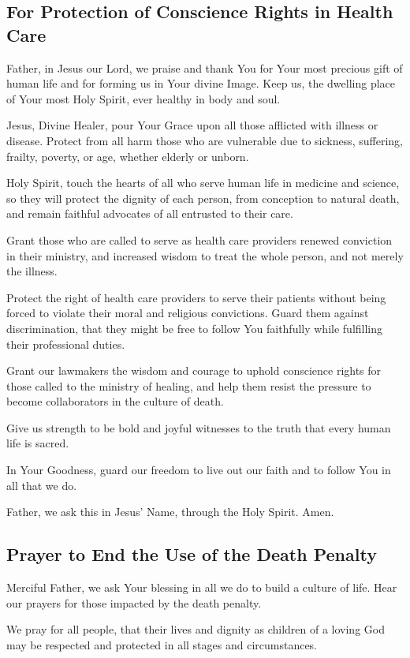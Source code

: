 \documentclass[12pt]{article}
\newcommand{\prayertitle}[1]{\subsection{#1}}
\begin{document}
\prayertitle{For Protection of Conscience Rights in Health Care}
Father, in Jesus our Lord, we praise and thank You for Your most precious gift of human life and for forming us in Your divine Image.
Keep us, the dwelling place of Your most Holy Spirit, ever healthy in body and soul.

Jesus, Divine Healer, pour Your Grace upon all those afflicted with illness or disease.
Protect from all harm those who are vulnerable due to sickness, suffering, frailty, poverty, or age, whether elderly or unborn.

Holy Spirit, touch the hearts of all who serve human life in medicine and science, so they will protect the dignity of each person, from conception to natural death, and remain faithful advocates of all entrusted to their care.  

Grant those who are called to serve as health care providers renewed conviction in their ministry, and increased wisdom to treat the whole person, and not merely the illness.

Protect the right of health care providers to serve their patients without being forced to violate their moral and religious convictions.
Guard them against discrimination, that they might be free to follow You faithfully while fulfilling their professional duties.

Grant our lawmakers the wisdom and courage to uphold conscience rights for those called to the ministry of healing, and help them resist the pressure to become collaborators in the culture of death.

Give us strength to be bold and joyful witnesses to the truth that every human life is sacred.

In Your Goodness, guard our freedom to live out our faith and to follow You in all that we do.

Father, we ask this in Jesus' Name, through the Holy Spirit. Amen.

\prayertitle{Prayer to End the Use of the Death Penalty}
Merciful Father, we ask Your blessing in all we do to build a culture of life.
Hear our prayers for those impacted by the death penalty.

We pray for all people, that their lives and dignity as children of a loving God may be respected and protected in all stages and circumstances.
\end{document}
